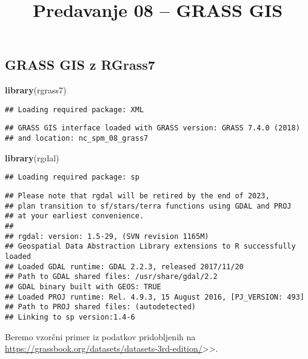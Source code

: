 \documentclass[]{article}
\title{Predavanje 08 -- GRASS GIS}
\author{}
\date{\vspace{-2.5em}}
\newenvironment{Shaded}{\begin{snugshade}}{\end{snugshade}}
\newcommand{\KeywordTok}[1]{\textcolor[rgb]{0.13,0.29,0.53}{\textbf{#1}}}
\newcommand{\NormalTok}[1]{#1}
\begin{document}
\maketitle

\subsection{GRASS GIS z RGrass7}\label{grass-gis-z-rgrass7}

\begin{Shaded}
\begin{Highlighting}[]
\KeywordTok{library}\NormalTok{(rgrass7)}
\end{Highlighting}
\end{Shaded}

\begin{verbatim}
## Loading required package: XML
\end{verbatim}

\begin{verbatim}
## GRASS GIS interface loaded with GRASS version: GRASS 7.4.0 (2018)
## and location: nc_spm_08_grass7
\end{verbatim}

\begin{Shaded}
\begin{Highlighting}[]
\KeywordTok{library}\NormalTok{(rgdal)}
\end{Highlighting}
\end{Shaded}

\begin{verbatim}
## Loading required package: sp
\end{verbatim}

\begin{verbatim}
## Please note that rgdal will be retired by the end of 2023,
## plan transition to sf/stars/terra functions using GDAL and PROJ
## at your earliest convenience.
## 
## rgdal: version: 1.5-29, (SVN revision 1165M)
## Geospatial Data Abstraction Library extensions to R successfully loaded
## Loaded GDAL runtime: GDAL 2.2.3, released 2017/11/20
## Path to GDAL shared files: /usr/share/gdal/2.2
## GDAL binary built with GEOS: TRUE 
## Loaded PROJ runtime: Rel. 4.9.3, 15 August 2016, [PJ_VERSION: 493]
## Path to PROJ shared files: (autodetected)
## Linking to sp version:1.4-6
\end{verbatim}

Beremo vzorčni primer iz podatkov pridobljenih na
\url{https://grassbook.org/datasets/datasets-3rd-edition/}\textgreater{}\textgreater{}.
\end{document}
